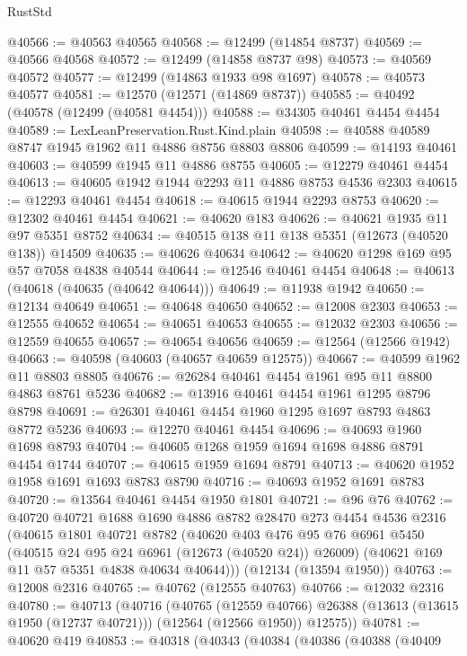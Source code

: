 \begin{lexlean}{RustStd}
\begin{coremodule}
{\begin{coremodule}
{{{{{{{{{{{{{{{{{{{{{{{{{{{{{{{{{{{{{{{{{{{{{{{{{{{{{{{{{{{{{{{{{{{{{{{{{{{{{{{{@40566 := @40563 @40565
@40568 := @12499 (@14854 @8737)
@40569 := @40566 @40568
@40572 := @12499 (@14858 @8737 @98)
@40573 := @40569 @40572
@40577 := @12499 (@14863 @1933 @98 @1697)
@40578 := @40573 @40577
@40581 := @12570 (@12571 (@14869 @8737))
@40585 := @40492 (@40578 (@12499 (@40581 @4454)))
@40588 := @34305 @40461 @4454 @4454
@40589 := LexLeanPreservation.Rust.Kind.plain
@40598 := @40588 @40589 @8747 @1945 @1962 @11 @4886 @8756 @8803 @8806
@40599 := @14193 @40461
@40603 := @40599 @1945 @11 @4886 @8755
@40605 := @12279 @40461 @4454
@40613 := @40605 @1942 @1944 @2293 @11 @4886 @8753 @4536 @2303
@40615 := @12293 @40461 @4454
@40618 := @40615 @1944 @2293 @8753
@40620 := @12302 @40461 @4454
@40621 := @40620 @183
@40626 := @40621 @1935 @11 @97 @5351 @8752
@40634 := @40515 @138 @11 @138 @5351 (@12673 (@40520 @138)) @14509
@40635 := @40626 @40634
@40642 := @40620 @1298 @169 @95 @57 @7058 @4838 @40544
@40644 := @12546 @40461 @4454
@40648 := @40613 (@40618 (@40635 (@40642 @40644)))
@40649 := @11938 @1942
@40650 := @12134 @40649
@40651 := @40648 @40650
@40652 := @12008 @2303
@40653 := @12555 @40652
@40654 := @40651 @40653
@40655 := @12032 @2303
@40656 := @12559 @40655
@40657 := @40654 @40656
@40659 := @12564 (@12566 @1942)
@40663 := @40598 (@40603 (@40657 @40659 @12575))
@40667 := @40599 @1962 @11 @8803 @8805
@40676 := @26284 @40461 @4454 @1961 @95 @11 @8800 @4863 @8761 @5236
@40682 := @13916 @40461 @4454 @1961 @1295 @8796 @8798
@40691 := @26301 @40461 @4454 @1960 @1295 @1697 @8793 @4863 @8772 @5236
@40693 := @12270 @40461 @4454
@40696 := @40693 @1960 @1698 @8793
@40704 := @40605 @1268 @1959 @1694 @1698 @4886 @8791 @4454 @1744
@40707 := @40615 @1959 @1694 @8791
@40713 := @40620 @1952 @1958 @1691 @1693 @8783 @8790
@40716 := @40693 @1952 @1691 @8783
@40720 := @13564 @40461 @4454 @1950 @1801
@40721 := @96 @76
@40762 := @40720
    @40721
    @1688
    @1690
    @4886
    @8782
    @28470
    @273
    @4454
    @4536
    @2316
    (@40615
      @1801
      @40721
      @8782
      (@40620
        @403
        @476
        @95
        @76
        @6961
        @5450
        (@40515 @24 @95 @24 @6961 (@12673 (@40520 @24)) @26009)
        (@40621 @169 @11 @57 @5351 @4838 @40634 @40644)))
    (@12134 (@13594 @1950))
@40763 := @12008 @2316
@40765 := @40762 (@12555 @40763)
@40766 := @12032 @2316
@40780 := @40713
    (@40716
      (@40765
        (@12559 @40766)
        @26388
        (@13613 (@13615 @1950 (@12737 @40721)))
        (@12564 (@12566 @1950))
        @12575))
@40781 := @40620 @419
@40853 := @40318
    (@40343
      (@40384
        (@40386
          (@40388
            (@40409
}}}}}}}}}}}}}}}}}}}}}}}}}}}}}}}}}}}}}}}}}}}}}}}}}}}}}}}}}}}}}}}}}}}}}}}}}}}}}}}}
\end{coremodule}}
\end{coremodule}
\end{lexlean}
